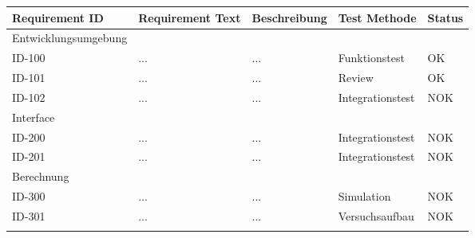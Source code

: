 \begin{tabular}{|l|l|l|l|l|}
	\hline
	Requirement ID & Requirement Text & Beschreibung & Test Methode & Status \\
	\hline\hline
	Entwicklungsumgebung   &  &  &  &  \\
	ID-100 & ... & ... & Funktionstest & OK \\
	ID-101 & ... & ... & Review & OK \\
	ID-102 & ... & ... & Integrationstest & NOK \\ 
	\hline
	Interface &  &  &  &  \\
	ID-200 & ... & ... & Integrationstest & NOK \\ 
	ID-201 & ... & ... & Integrationstest & NOK \\ 
	\hline
	Berechnung &  &  &  &  \\
	ID-300 & ... & ... & Simulation & NOK \\ 
	ID-301 & ... & ... & Versuchsaufbau & NOK \\ 
	\hline
	& & & & \\
\end{tabular}